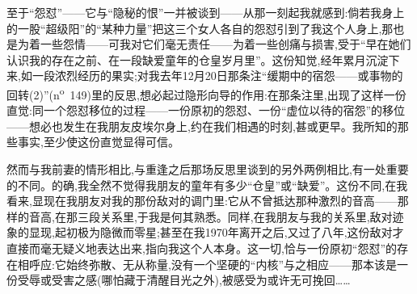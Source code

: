 至于“怨怼”——它与“隐秘的恨”一并被谈到——从那一刻起我就感到:倘若我身上的一股“超级阳”的“某种力量”把这三个女人各自的怨怼引到了我这个人身上,那也是为着一些怨情——可我对它们毫无责任——为着一些创痛与损害,受于“早在她们认识我的存在之前、在一段缺爱童年的仓皇岁月里”。这份知觉,经年累月沉淀下来,如一段浓烈经历的果实;对我去年12月20日那条注“缓期中的宿怨——或事物的回转(2)”(n\textsuperscript{o}~149)里的反思,想必起过隐形向导的作用:在那条注里,出现了这样一份直觉:同一个怨怼移位的过程——一份原初的怨怼、一份“虚位以待的宿怨”的移位——想必也发生在我朋友皮埃尔身上,约在我们相遇的时刻,甚或更早。我所知的那些事实,至少使这份直觉显得可信。

然而与我前妻的情形相比,与重逢之后那场反思里谈到的另外两例相比,有一处重要的不同。的确,我全然不觉得我朋友的童年有多少“仓皇”或“缺爱”。这份不同,在我看来,显现在我朋友对我的那份敌对的调门里:它从不曾抵达那种激烈的音高——那样的音高,在那三段关系里,于我是何其熟悉。同样,在我朋友与我的关系里,敌对迹象的显现,起初极为隐微而零星;甚至在我1970年离开之后,又过了八年,这份敌对才直接而毫无疑义地表达出来,指向我这个人本身。这一切,恰与一份原初“怨怼”的存在相呼应:它始终弥散、无从称量,没有一个坚硬的“内核”与之相应——那本该是一份受辱或受害之感(哪怕藏于清醒目光之外),被感受为或许无可挽回……

